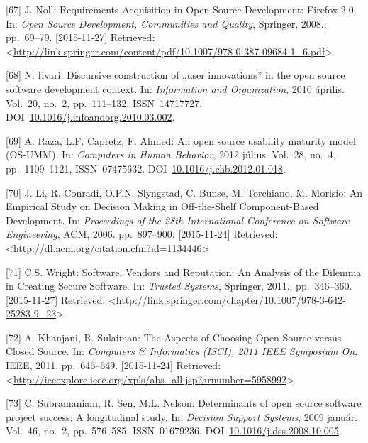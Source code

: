 \documentclass[12pt,magyar,a4paper,oneside]{scrreprt}
\begin{document}
\leavevmode\hypertarget{ref-noll_requirements_2008}{}%
{[}67{]} J. Noll: Requirements Acquisition in Open Source Development:
Firefox 2.0. In: \emph{Open Source Development, Communities and
Quality}, Springer, 2008., pp.~69--79. {[}2015-11-27{]} Retrieved:
\textless{}\url{http://link.springer.com/content/pdf/10.1007/978-0-387-09684-1_6.pdf}\textgreater{}

\leavevmode\hypertarget{ref-iivari_discursive_2010}{}%
{[}68{]} N. Iivari: Discursive construction of „user innovations'' in
the open source software development context. In: \emph{Information and
Organization}, 2010 április. Vol.~20, no.~2, pp.~111--132,
ISSN~14717727.
DOI~\href{https://doi.org/10.1016/j.infoandorg.2010.03.002}{10.1016/j.infoandorg.2010.03.002}.

\leavevmode\hypertarget{ref-raza_open_2012}{}%
{[}69{]} A. Raza, L.F. Capretz, F. Ahmed: An open source usability
maturity model (OS-UMM). In: \emph{Computers in Human Behavior}, 2012
július. Vol.~28, no.~4, pp.~1109--1121, ISSN~07475632.
DOI~\href{https://doi.org/10.1016/j.chb.2012.01.018}{10.1016/j.chb.2012.01.018}.

\leavevmode\hypertarget{ref-li_empirical_2006}{}%
{[}70{]} J. Li, R. Conradi, O.P.N. Slyngstad, C. Bunse, M. Torchiano, M.
Morisio: An Empirical Study on Decision Making in Off-the-Shelf
Component-Based Development. In: \emph{Proceedings of the 28th
International Conference on Software Engineering}, ACM, 2006.
pp.~897--900. {[}2015-11-24{]} Retrieved:
\textless{}\url{http://dl.acm.org/citation.cfm?id=1134446}\textgreater{}

\leavevmode\hypertarget{ref-wright_software_2011}{}%
{[}71{]} C.S. Wright: Software, Vendors and Reputation: An Analysis of
the Dilemma in Creating Secure Software. In: \emph{Trusted Systems},
Springer, 2011., pp.~346--360. {[}2015-11-27{]} Retrieved:
\textless{}\url{http://link.springer.com/chapter/10.1007/978-3-642-25283-9_23}\textgreater{}

\leavevmode\hypertarget{ref-khanjani_aspects_2011}{}%
{[}72{]} A. Khanjani, R. Sulaiman: The Aspects of Choosing Open Source
versus Closed Source. In: \emph{Computers \& Informatics (ISCI), 2011
IEEE Symposium On}, IEEE, 2011. pp.~646--649. {[}2015-11-24{]}
Retrieved:
\textless{}\url{http://ieeexplore.ieee.org/xpls/abs_all.jsp?arnumber=5958992}\textgreater{}

\leavevmode\hypertarget{ref-subramaniam_determinants_2009}{}%
{[}73{]} C. Subramaniam, R. Sen, M.L. Nelson: Determinants of open
source software project success: A longitudinal study. In:
\emph{Decision Support Systems}, 2009 január. Vol.~46, no.~2,
pp.~576--585, ISSN~01679236.
DOI~\href{https://doi.org/10.1016/j.dss.2008.10.005}{10.1016/j.dss.2008.10.005}.
\end{document}
